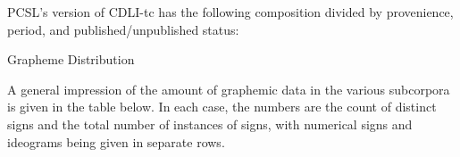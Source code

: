 \par PCSL's version of CDLI-tc has the following composition
      divided by provenience, period, and published/unpublished
      status:

\bigskip

	\centerline{\vbox{\offinterlineskip{}
}}\Hhhh{}Grapheme Distribution


\par A general impression of the amount of graphemic data in the
      various subcorpora is given in the table below.  In each case,
      the numbers are the count of distinct signs and the total number
      of instances of signs, with numerical signs and ideograms being
      given in separate rows.

\bigskip

